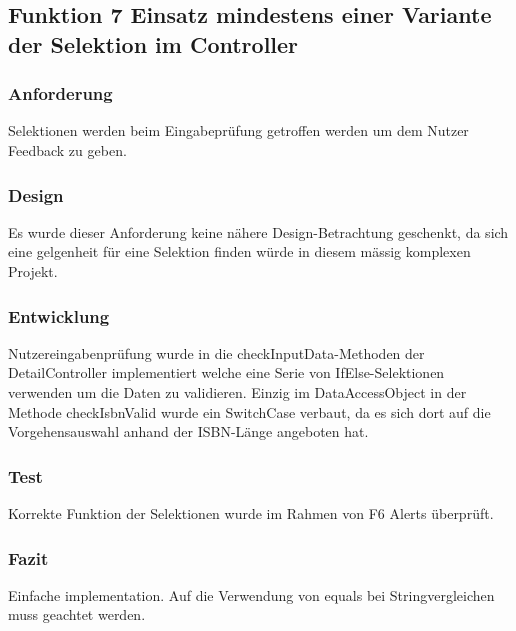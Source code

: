 \subsection[Funktion 7 Selektion]{Funktion 7 Einsatz mindestens einer Variante der Selektion im Controller}

\subsubsection{Anforderung}
Selektionen werden beim Eingabeprüfung getroffen werden um dem Nutzer Feedback zu geben.

\subsubsection{Design}
Es wurde dieser Anforderung keine nähere Design-Betrachtung geschenkt, da sich eine gelgenheit für eine Selektion finden würde in diesem mässig komplexen Projekt.

\subsubsection{Entwicklung}
Nutzereingabenprüfung wurde in die checkInputData-Methoden der DetailController implementiert welche eine Serie von IfElse-Selektionen verwenden um die Daten zu validieren. Einzig im DataAccessObject in der Methode checkIsbnValid wurde ein SwitchCase verbaut, da es sich dort auf die Vorgehensauswahl anhand der ISBN-Länge angeboten hat.

\subsubsection{Test}
Korrekte Funktion der Selektionen wurde im Rahmen von F6 Alerts überprüft.

\subsubsection{Fazit}
Einfache implementation. Auf die Verwendung von equals bei Stringvergleichen muss geachtet werden.